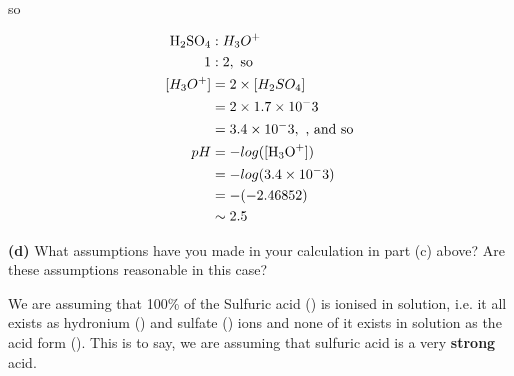 \documentclass{article}
\begin{document}
{{so

\begin{align*}
  \ce{H_2SO_4}&:H_3O^+ \\
  1&:2, \text{ so} \\
  [H_3O^+]&= 2 \times [H_2SO_4] \\
          &= 2 \times 1.7 \times 10^-3 \\
          &= 3.4 \times 10^-3, \text{ , and so} \\
  pH  &= -log([\ce{H_3O^+}]) \\
      &= -log(3.4 \times 10^-3) \\
      &= -(-2.46852) \\
      &\sim 2.5
\end{align*}
}

\pagebreak
\textbf{(d)} What assumptions have you made in your calculation in part (c) above? Are these assumptions reasonable in this case?
\vspace{0.2cm}

{\color{red}
We are assuming that 100\% of the Sulfuric acid () is ionised in solution, i.e. it all exists as hydronium () and sulfate () ions and none of it exists in solution as the acid form (). This is to say, we are assuming that sulfuric acid is a very \textbf{strong} acid.

}

}
\end{document}
